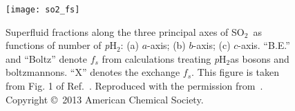 \documentclass[12pt]{iopart}
\newcommand{\sotwo}{SO$_2$}
\newcommand{\phtwo}{{\em p}H$_2$}
\begin{document}
\begin{figure}[h]
\centerline {\texttt{[image: so2\_fs]}}
\caption{Superfluid fractions along the three principal axes of \sotwo~as functions of number of \phtwo: (a) $a$-axis; (b) $b$-axis; (c) $c$-axis. ``B.E.'' and ``Boltz'' denote $f_s$ from calculations treating \phtwo as bosons and boltzmannons. ``X'' denotes the exchange $f_s$. This figure is taken from Fig. 1 of Ref.~\cite{zeng_so2ph2}. Reproduced with the permission from~\cite{zeng_so2ph2}. Copyright \copyright~2013 American Chemical Society.}
\label{fig:so2_fs}
\end{figure}
\end{document}
